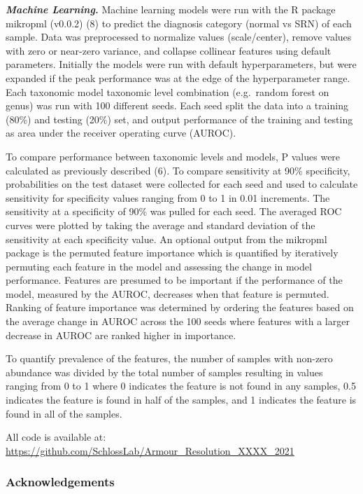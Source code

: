 \documentclass[
]{article}
\begin{document}
\textbf{\emph{Machine Learning.}} Machine learning models were run with
the R package mikropml (v0.0.2) (8) to predict the diagnosis category
(normal vs SRN) of each sample. Data was preprocessed to normalize
values (scale/center), remove values with zero or near-zero variance,
and collapse collinear features using default parameters. Initially the
models were run with default hyperparameters, but were expanded if the
peak performance was at the edge of the hyperparameter range. Each
taxonomic model taxonomic level combination (e.g.~random forest on
genus) was run with 100 different seeds. Each seed split the data into a
training (80\%) and testing (20\%) set, and output performance of the
training and testing as area under the receiver operating curve (AUROC).

To compare performance between taxonomic levels and models, P values
were calculated as previously described (6). To compare sensitivity at
90\% specificity, probabilities on the test dataset were collected for
each seed and used to calculate sensitivity for specificity values
ranging from 0 to 1 in 0.01 increments. The sensitivity at a specificity
of 90\% was pulled for each seed. The averaged ROC curves were plotted
by taking the average and standard deviation of the sensitivity at each
specificity value. An optional output from the mikropml package is the
permuted feature importance which is quantified by iteratively permuting
each feature in the model and assessing the change in model performance.
Features are presumed to be important if the performance of the model,
measured by the AUROC, decreases when that feature is permuted. Ranking
of feature importance was determined by ordering the features based on
the average change in AUROC across the 100 seeds where features with a
larger decrease in AUROC are ranked higher in importance.

To quantify prevalence of the features, the number of samples with
non-zero abundance was divided by the total number of samples resulting
in values ranging from 0 to 1 where 0 indicates the feature is not found
in any samples, 0.5 indicates the feature is found in half of the
samples, and 1 indicates the feature is found in all of the samples.

All code is available at:
\url{https://github.com/SchlossLab/Armour_Resolution_XXXX_2021}

\hypertarget{acknowledgements}{%
\subsubsection{Acknowledgements}\label{acknowledgements}}
\end{document}
